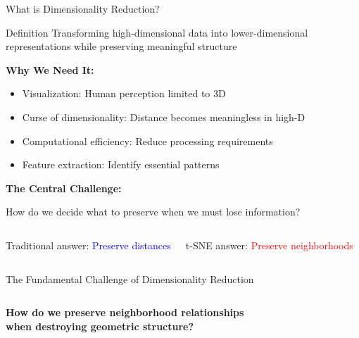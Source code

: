 \documentclass[aspectratio=169]{beamer}
\begin{document}
\begin{frame}{What is Dimensionality Reduction?}
\begin{block}{Definition}
Transforming high-dimensional data into lower-dimensional representations while preserving meaningful structure
\end{block}

\textbf{Why We Need It:}
\begin{itemize}
\item Visualization: Human perception limited to 3D
\item Curse of dimensionality: Distance becomes meaningless in high-D
\item Computational efficiency: Reduce processing requirements
\item Feature extraction: Identify essential patterns
\end{itemize}

\textbf{The Central Challenge:}
\begin{center}
\Large How do we decide what to preserve when we must lose information?
\end{center}

\begin{columns}
\centering
Traditional answer: \textcolor{blue}{Preserve distances}

\centering
t-SNE answer: \textcolor{red}{Preserve neighborhoods}
\end{columns}
\end{frame}

\begin{frame}{The Fundamental Challenge of Dimensionality Reduction}
\begin{columns}
\begin{center}
\end{center}

\begin{center}
\end{center}
\end{columns}

\vspace{0.5cm}
\begin{center}
\Large\textbf{How do we preserve neighborhood relationships \\ when destroying geometric structure?}
\end{center}
\end{frame}
\end{document}
